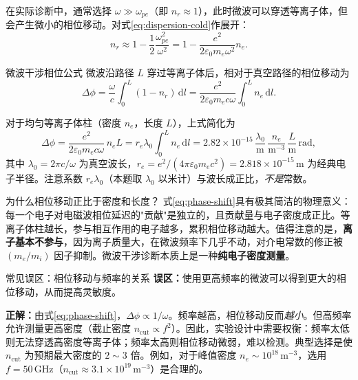 \documentclass[12pt,a4paper,openany,oneside]{book}
\newcommand{\diff}{\mathrm{d}}
\newcommand{\eps}{\varepsilon}
\begin{document}
在实际诊断中，通常选择 $\omega \gg \omega_{pe}$（即 $n_r \approx 1$），此时微波可以穿透等离子体，但会产生微小的相位移动。对式\eqref{eq:dispersion-cold}作展开：
\begin{equation}
n_r \approx 1 - \frac{1}{2}\frac{\omega_{pe}^2}{\omega^2}
= 1 - \frac{e^2}{2\eps_0 m_e \omega^2} n_e.
\label{eq:ch12-refractive-index}
\end{equation}

\begin{theorem}{微波干涉相位公式}{}{}
微波沿路径 $L$ 穿过等离子体后，相对于真空路径的相位移动为
\begin{equation}
\Delta\phi = \frac{\omega}{c}\int_0^L (1 - n_r)\,\diff l
= \frac{e^2}{2\eps_0 m_e c \omega} \int_0^L n_e\,\diff l.
\label{eq:phase-shift}
\end{equation}

对于均匀等离子体柱（密度 $n_e$，长度 $L$），上式简化为
\begin{equation}
\Delta\phi = \frac{e^2}{2\eps_0 m_e c \omega}\, n_e L
= r_e\lambda_0 \int_0^L n_e\,\diff l
= 2.82\times 10^{-15}\,\frac{\lambda_0}{\mathrm{m}} \,\frac{n_e}{\mathrm{m}^{-3}}\,\frac{L}{\mathrm{m}}\,\mathrm{rad},
\label{eq:phase-shift-uniform}
\end{equation}
其中 $\lambda_0 = 2\pi c/\omega$ 为真空波长，$r_e = e^2/(4\pi\eps_0 m_e c^2) = 2.818\times 10^{-15}\,\mathrm{m}$ 为经典电子半径。注意系数 $r_e\lambda_0$（本题取 $\lambda_0$ 以米计）与波长成正比，\emph{不是}常数。
\end{theorem}

\begin{insight}{为什么相位移动正比于密度和长度？}{}
式\eqref{eq:phase-shift}具有极其简洁的物理意义：每一个电子对电磁波相位延迟的"贡献"是独立的，且贡献量与电子密度成正比。等离子体柱越长，参与相互作用的电子越多，累积相位移动越大。值得注意的是，\textbf{离子基本不参与}，因为离子质量大，在微波频率下几乎不动，对介电常数的修正被 $(m_e/m_i)$ 因子抑制。微波干涉诊断本质上是一种\textbf{纯电子密度测量}。
\end{insight}

\begin{warning}{常见误区：相位移动与频率的关系}{}
\textbf{误区：}使用更高频率的微波可以得到更大的相位移动，从而提高灵敏度。

\textbf{正解：}由式\eqref{eq:phase-shift}，$\Delta\phi \propto 1/\omega$。频率越高，相位移动反而\emph{越小}。但高频率允许测量更高密度（截止密度 $n_{\mathrm{cut}} \propto f^2$）。因此，实验设计中需要权衡：频率太低则无法穿透高密度等离子体；频率太高则相位移动微弱，难以检测。典型选择是使 $n_{\mathrm{cut}}$ 为预期最大密度的 $2\sim 3$ 倍。例如，对于峰值密度 $n_e \sim 10^{18}\,\mathrm{m}^{-3}$，选用 $f = 50\,\mathrm{GHz}$（$n_{\mathrm{cut}} \approx 3.1\times 10^{19}\,\mathrm{m}^{-3}$）是合理的。
\end{warning}
\end{document}
